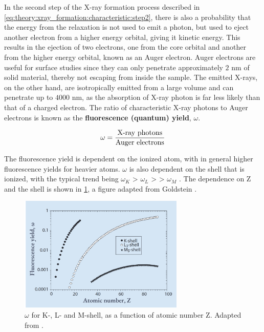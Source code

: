 In the second step of the X-ray formation process described in \cref{eq:theory:xray_formation:characteristic:step2}, there is also a probability that the energy from the relaxation is not used to emit a photon, but used to eject another electron from a higher energy orbital, giving it kinetic energy.
This results in the ejection of two electrons, one from the core orbital and another from the higher energy orbital, known as an Auger electron.
Auger electrons are useful for surface studies since they can only penetrate approximately $2$ nm of solid material, thereby not escaping from inside the sample.
The emitted X-rays, on the other hand, are isotropically emitted from a large volume and can penetrate up to $4000$ nm, as the absorption of X-ray photon is far less likely than that of a charged electron. 
The ratio of characteristic X-ray photons to Auger electrons is known as the \textbf{fluorescence (quantum) yield}, $\omega$.

\begin{equation}
    \label{eq:theory:theoreticalxray:yield}
    \omega = \frac{\textnormal{X-ray photons}}{\textnormal{Auger electrons}}
\end{equation}

The fluorescence yield is dependent on the ionized atom, with in general higher fluorescence yields for heavier atoms.
$\omega$ is also dependent on the shell that is ionized, with the typical trend being $\omega_K$ > $\omega_L$ > > $\omega_M$ \cite[p. 267]{goldstein_scanning_2018}.
The dependence on Z and the shell is shown in \cref{fig:theory:fluorescence_yield}, a figure adapted from Goldstein \cite[Fig. 4.3 (d)]{goldstein_scanning_2018}.

\begin{figure}[ht]
    \centering
    \includegraphics[width=0.7\textwidth]{figures/fluorescence_yield_Goldstein_Fig4-3-d.png}
    \caption{
        $\omega$ for K-, L- and M-shell, as a function of atomic number Z.
        Adapted from \cite[Fig. 4.3 (d)]{goldstein_scanning_2018}.
    }
    \label{fig:theory:fluorescence_yield}
\end{figure}








